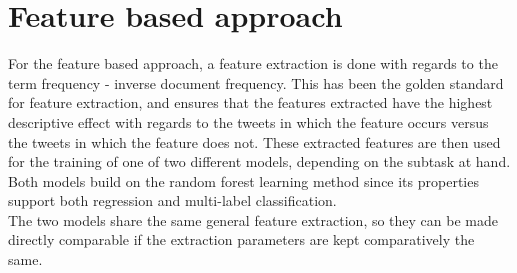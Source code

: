 
\section{Feature based approach}\label{sec:feature}

For the feature based approach, a feature extraction is done with regards to the term frequency - inverse document frequency. This has been the golden standard for feature extraction, and ensures that the features extracted have the highest descriptive effect with regards to the tweets in which the feature occurs versus the tweets in which the feature does not. These extracted features are then used for the training of one of two different models, depending on the subtask at hand.\\
Both models build on the random forest learning method since its properties support both regression and multi-label classification. \\
The two models share the same general feature extraction, so they can be made directly comparable if the extraction parameters are kept comparatively the same.

